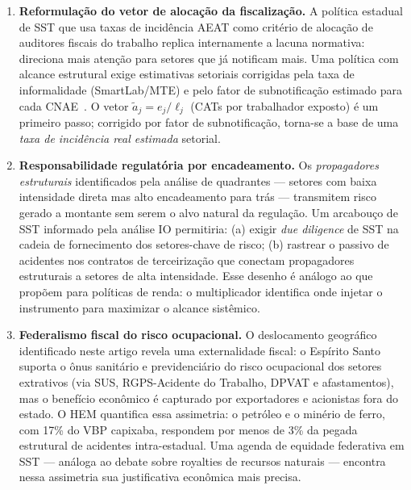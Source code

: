\documentclass[12pt, a4paper]{article}
\begin{document}
\begin{enumerate}
  \item \textbf{Reformulação do vetor de alocação da fiscalização.}
    A política estadual de SST que usa taxas de incidência AEAT como
    critério de alocação de auditores fiscais do trabalho replica
    internamente a lacuna normativa: direciona mais atenção para
    setores que já notificam mais. Uma política com alcance estrutural
    exige estimativas setoriais corrigidas pela taxa de informalidade
    (SmartLab/MTE) e pelo fator de subnotificação estimado para cada
    CNAE~\citep{wunsch2004perfil,cordeiro2005underreporting}. O vetor
    $\tilde{a}_j = e_j/\ell_j$ (CATs por trabalhador exposto) é um
    primeiro passo; corrigido por fator de subnotificação, torna-se a
    base de uma \textit{taxa de incidência real estimada} setorial.

  \item \textbf{Responsabilidade regulatória por encadeamento.}
    Os \textit{propagadores estruturais} identificados pela análise de
    quadrantes --- setores com baixa intensidade direta mas alto
    encadeamento para trás --- transmitem risco gerado a montante sem
    serem o alvo natural da regulação. Um arcabouço de SST informado
    pela análise IO permitiria: (a) exigir \textit{due diligence} de
    SST na cadeia de fornecimento dos setores-chave de risco; (b)
    rastrear o passivo de acidentes nos contratos de terceirização que
    conectam propagadores estruturais a setores de alta intensidade.
    Esse desenho é análogo ao que \citet{made2021multiplicadores}
    propõem para políticas de renda: o multiplicador identifica onde
    injetar o instrumento para maximizar o alcance sistêmico.

  \item \textbf{Federalismo fiscal do risco ocupacional.}
    O deslocamento geográfico identificado neste artigo revela uma
    externalidade fiscal: o Espírito Santo suporta o ônus sanitário e
    previdenciário do risco ocupacional dos setores extrativos (via
    SUS, RGPS-Acidente do Trabalho, DPVAT e afastamentos), mas o
    benefício econômico é capturado por exportadores e acionistas fora
    do estado. O HEM quantifica essa assimetria: o petróleo e o minério
    de ferro, com 17\% do VBP capixaba, respondem por menos de 3\% da
    pegada estrutural de acidentes intra-estadual. Uma agenda de
    equidade federativa em SST --- análoga ao debate sobre royalties
    de recursos naturais --- encontra nessa assimetria sua
    justificativa econômica mais precisa.
\end{enumerate}
\end{document}
